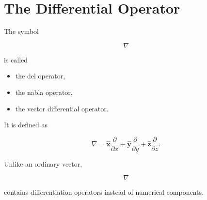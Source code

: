 \section{The Differential Operator}

The symbol

\[
\boxed{
	\nabla
}
\]

is called

\begin{itemize}
	\item the del operator,
	\item the nabla operator,
	\item the vector differential operator.
\end{itemize}

It is defined as

\[
\boxed{
	\nabla
	=
	\hat{\mathbf x}\frac{\partial}{\partial x}
	+
	\hat{\mathbf y}\frac{\partial}{\partial y}
	+
	\hat{\mathbf z}\frac{\partial}{\partial z}.
}
\]

Unlike an ordinary vector,

\[
\nabla
\]

contains differentiation operators instead of numerical components.

